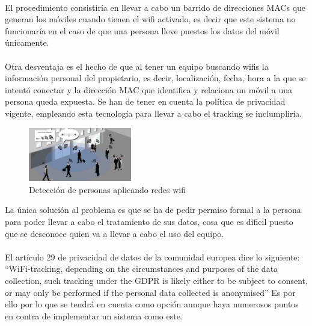 \documentclass[a4paper ,12pt, onecolumn]{article}
\begin{document}
            \paragraph{}
            El procedimiento consistiría en llevar a cabo un barrido de direcciones MACs que generan los móviles cuando tienen el wifi activado,
            es decir que este sistema no funcionaría en el caso de que una persona lleve puestos los datos del móvil únicamente.
            \paragraph{}
            Otra desventaja es el hecho de que al tener un equipo buscando wifis la información personal del propietario, es decir, localización,
            fecha, hora a la que se intentó conectar y la dirección MAC que identifica y relaciona un móvil a una persona queda expuesta.
            Se han de tener en cuenta la política de privacidad vigente, empleando esta tecnología para llevar a cabo el tracking se inclumpliría.
            \begin{center}
                \begin{figure}[ht]
                    \centering
                    \includegraphics[width=0.4\textwidth]{WifiCounting.jpg}
                    \caption{Detección de personas aplicando redes wifi}
                    \label{fig:mesh1}
                \end{figure}
            \end{center}
            La única solución al problema es que se ha de pedir permiso formal a la persona para poder llevar a cabo
            el tratamiento de sus datos, cosa que es dificil puesto que se desconoce quien va a llevar a cabo el uso del equipo.
            \paragraph{}
            El artículo 29 de privacidad de datos de la comunidad europea dice lo siguiente:
            “WiFi-tracking, depending on the circumstances and purposes of the data collection, such tracking under the GDPR is likely
            either to be subject to consent, or may only be performed if the personal data collected is anonymised”
            Es por ello por lo que  se tendrá en cuenta como opción aunque haya numerosos puntos en contra de implementar un sistema como este.
\end{document}
